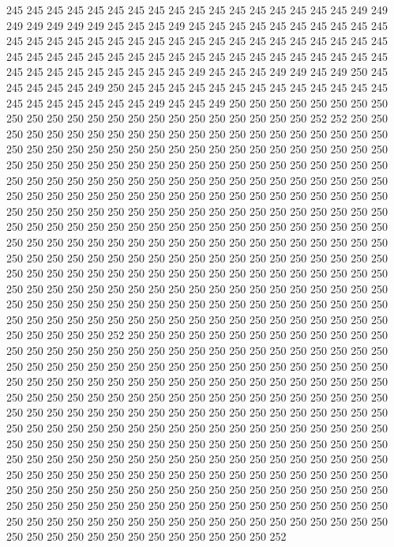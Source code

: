 245 245 245 245 245 245 245 245 245 245 245 245 245 245 245 245 245 249 249 249
249 249 249 249 245 245 245 249 245 245 245 245 245 245 245 245 245 245 245 245
245 245 245 245 245 245 245 245 245 245 245 245 245 245 245 245 245 245 245 245
245 245 245 245 245 245 245 245 245 245 245 245 245 245 245 245 245 245 245 245
245 245 245 245 245 249 245 245 245 249 249 245 249 250 245 245 245 245 245 249
250 245 245 245 245 245 245 245 245 245 245 245 245 245 245 245 245 245 245 245
245 249 245 245 249 250 250 250 250 250 250 250 250 250 250 250 250 250 250 250
250 250 250 250 250 250 250 250 252 252 250 250 250 250 250 250 250 250 250 250
250 250 250 250 250 250 250 250 250 250 250 250 250 250 250 250 250 250 250 250
250 250 250 250 250 250 250 250 250 250 250 250 250 250 250 250 250 250 250 250
250 250 250 250 250 250 250 250 250 250 250 250 250 250 250 250 250 250 250 250
250 250 250 250 250 250 250 250 250 250 250 250 250 250 250 250 250 250 250 250
250 250 250 250 250 250 250 250 250 250 250 250 250 250 250 250 250 250 250 250
250 250 250 250 250 250 250 250 250 250 250 250 250 250 250 250 250 250 250 250
250 250 250 250 250 250 250 250 250 250 250 250 250 250 250 250 250 250 250 250
250 250 250 250 250 250 250 250 250 250 250 250 250 250 250 250 250 250 250 250
250 250 250 250 250 250 250 250 250 250 250 250 250 250 250 250 250 250 250 250
250 250 250 250 250 250 250 250 250 250 250 250 250 250 250 250 250 250 250 250
250 250 250 250 250 250 250 250 250 250 250 250 250 250 250 250 250 250 250 250
250 250 250 250 250 250 250 250 250 250 250 250 250 250 250 250 250 250 250 250
250 250 250 250 252 250 250 250 250 250 250 250 250 250 250 250 250 250 250 250
250 250 250 250 250 250 250 250 250 250 250 250 250 250 250 250 250 250 250 250
250 250 250 250 250 250 250 250 250 250 250 250 250 250 250 250 250 250 250 250
250 250 250 250 250 250 250 250 250 250 250 250 250 250 250 250 250 250 250 250
250 250 250 250 250 250 250 250 250 250 250 250 250 250 250 250 250 250 250 250
250 250 250 250 250 250 250 250 250 250 250 250 250 250 250 250 250 250 250 250
250 250 250 250 250 250 250 250 250 250 250 250 250 250 250 250 250 250 250 250
250 250 250 250 250 250 250 250 250 250 250 250 250 250 250 250 250 250 250 250
250 250 250 250 250 250 250 250 250 250 250 250 250 250 250 250 250 250 250 250
250 250 250 250 250 250 250 250 250 250 250 250 250 250 250 250 250 250 250 250
250 250 250 250 250 250 250 250 250 250 250 250 250 250 250 250 250 250 250 250
250 250 250 250 250 250 250 250 250 250 250 250 250 250 250 250 250 250 250 250
250 250 250 250 250 250 250 250 250 250 250 250 250 250 250 250 250 250 250 252
